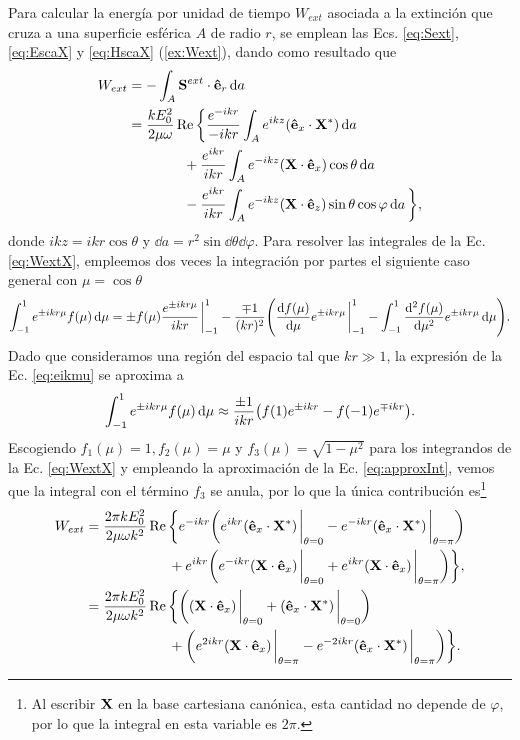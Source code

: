 Para calcular la energía por unidad de tiempo $W_{ext}$ asociada a la extinción que cruza a una superficie esférica $A$ de radio $r$, se emplean las Ecs. \eqref{eq:Sext}, \eqref{eq:EscaX} y \eqref{eq:HscaX}  (\ref{ex:Wext}), dando como resultado que
%	
\begin{align}
W_{ext} &= -\int_{A} \vb{S}^{ext}\cdot\vu{e}_r\dd{a}\notag\\
 &= \frac{kE_0^2}{2\mu\omega}\Re\bigg\{
\frac{e^{-ikr}}{-ikr}
	\int_A e^{ikz} (\vu{e}_x\cdot\vb{X}^*)\dd{a}\notag\\
&\qquad\qquad+\frac{e^{ikr}}{ikr}
	\int_A e^{-ikz}(\vb{X}\cdot\vu{e}_x)\cos\theta\dd{a}\notag\\
&\qquad\qquad-\frac{e^{ikr}}{ikr}
	\int_A e^{-ikz}(\vb{X}\cdot\vu{e}_z)\sin\theta\cos\varphi\dd{a}
	\bigg\},
	\label{eq:WextX}
\end{align}
donde $ikz = ikr\cos\theta$ y $\dd{a} =r^2 \sin\dd{\theta}\dd{\varphi}$. Para resolver las integrales de la Ec. \eqref{eq:WextX}, empleemos dos veces la integración por partes el siguiente caso general con $\mu = \cos\theta$ 
%
\begin{align}
\int_{-1}^{1} e^{\pm ikr\mu}f(\mu)\dd{\mu} = \pm
f(\mu)\frac{e^{\pm ikr\mu}}{ikr}\eval_{-1}^1 -
\frac{\mp 1}{(kr)^2}\qty(
\dv{f(\mu)}{\mu}e^{\pm ikr\mu}\eval_{-1}^1 -\int_{-1}^1\dv[2]{f(\mu)}{\mu}e^{\pm ikr\mu}\dd{\mu}
).
\label{eq:eikmu}
\end{align}
%
Dado que consideramos una región del espacio tal que $kr\gg 1$, la expresión de la Ec. \eqref{eq:eikmu} se aproxima a
%
\begin{align}
\int_{-1}^{1} e^{\pm ikr\mu}f(\mu)\dd{\mu} \approx \frac{\pm 1}{ikr}\qty(f(1) e^{\pm ikr} - f(-1)e^{\mp ikr}).
\label{eq:approxInt}
\end{align}
%
Escogiendo $f_1(\mu) = 1, f_2(\mu) = \mu$ y $f_3(\mu) = \sqrt{1-\mu^2}$ para los integrandos de la Ec. \eqref{eq:WextX} y empleando la aproximación de la Ec. \eqref{eq:approxInt}, vemos que la integral con el término $f_3$ se anula, por lo que la única contribución es\footnote{Al escribir $\vb{X}$ en la base cartesiana canónica, esta cantidad no depende de $\varphi$, por lo que la integral en esta variable es $2\pi$.}
%
\begin{align}
W_{ext} &=  \frac{2\pi kE_0^2}{2\mu\omega k^2}\Re\bigg\{
e^{-ikr}\qty(
 e^{ikr} (\vu{e}_x\cdot\vb{X}^*) \eval_{\theta=0} - e^{-ikr} (\vu{e}_x\cdot\vb{X}^*) \eval_{\theta=\pi}
 ) \notag \\
&\qquad\qquad\qquad+e^{ikr}\qty(
 e^{-ikr}(\vb{X}\cdot\vu{e}_x)\eval_{\theta=0} + e^{ikr}(\vb{X}\cdot\vu{e}_x)\eval_{\theta = \pi}
	 )
	\bigg\},\\
	&=  \frac{2\pi kE_0^2}{2\mu\omega k^2}\Re\bigg\{
\qty(
(\vb{X}\cdot\vu{e}_x)\eval_{\theta=0} +
 (\vu{e}_x\cdot\vb{X}^*) \eval_{\theta=0} 
 ) \notag \\
&\qquad\qquad\qquad+\qty( e^{2ikr}(\vb{X}\cdot\vu{e}_x)\eval_{\theta = \pi} - e^{-2ikr} (\vu{e}_x\cdot\vb{X}^*) \eval_{\theta=\pi}
	 )
	\bigg\}.
\end{align}
